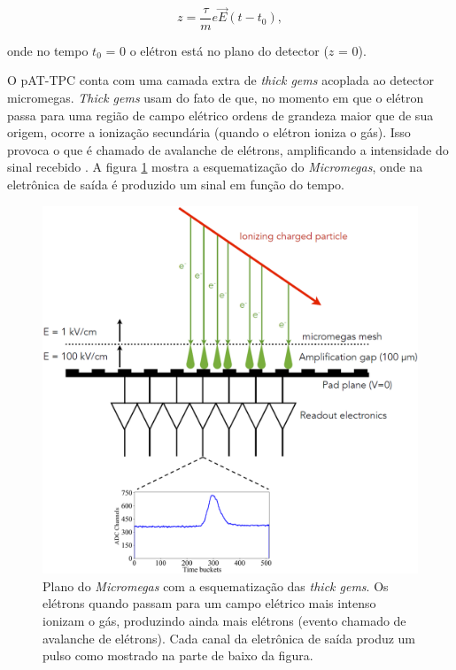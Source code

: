 \documentclass[a4paper,12pt,oneside]{book}
\begin{document}
\begin{equation}
    z = \frac{\tau}{m}e\vec{E}(t - t_0),
\end{equation}

onde no tempo $t_0$ = 0 o elétron está no plano do detector ($z$ = 0).

\par O pAT-TPC conta com uma camada extra de \textit{thick gems} acoplada ao detector micromegas. \textit{Thick gems} usam do fato de que, no momento em que o elétron passa para uma região de campo elétrico ordens de grandeza maior que de sua origem, ocorre a ionização secundária (quando o elétron ioniza o gás). Isso provoca o que é chamado de avalanche de elétrons, amplificando a intensidade do sinal recebido \cite{GET}. A figura \ref{fig:thick_gems} mostra a esquematização do \textit{Micromegas}, onde na eletrônica de saída é produzido um sinal em função do tempo.

\begin{figure}[H]
    \centering
    \includegraphics[scale = 0.40]{figs/thick_gems_2.png}
    \caption{Plano do \textit{Micromegas} com a esquematização das \textit{thick gems}. Os elétrons quando passam para um campo elétrico mais intenso ionizam o gás, produzindo ainda mais elétrons (evento chamado de avalanche de elétrons). Cada canal da eletrônica de saída produz um pulso como mostrado na parte de baixo da figura.}
    \label{fig:thick_gems}
\end{figure}
\end{document}
